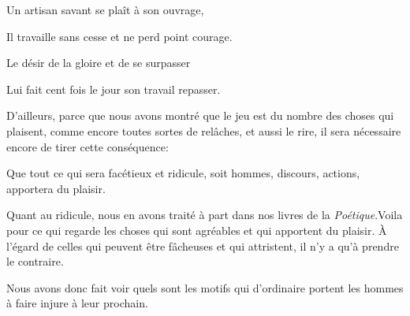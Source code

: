 \begin{emphpar}
	Un artisan savant se plaît à son ouvrage,

	Il travaille sans cesse et ne perd point courage.

	Le désir de la gloire et de se surpasser

	Lui fait cent fois le jour son travail repasser.
\end{emphpar}

\bigbreak

D'ailleurs, parce que nous avons montré que le jeu est du nombre des choses qui plaisent, comme encore toutes
sortes de relâches, et aussi le rire, il sera nécessaire encore de tirer cette conséquence:

\begin{lieu}
	Que tout ce qui sera facétieux et ridicule, soit hommes, discours, actions, apportera du plaisir.
\end{lieu}

Quant au ridicule, nous en avons traité à part dans nos livres de la \emph{Poétique}.Voila pour ce qui regarde
les choses qui sont agréables et qui apportent du plaisir. À l'égard de celles qui peuvent être fâcheuses et qui
attristent, il n'y a qu'à prendre le contraire.

\bigbreak

Nous avons donc fait voir quels sont les motifs qui d'ordinaire portent les hommes à faire injure à leur prochain.
